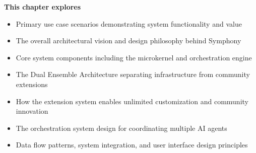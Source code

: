\begin{tcolorbox}[
    enhanced,
    colback=white,
    colframe=brandAccent!40,
    boxrule=1pt,
    arc=12pt,
    drop shadow={brandAccent!20},
    left=1.5cm,
    right=1.5cm,
    top=1.0cm,
    bottom=1.0cm,
    before upper={\parindent0pt}
]
\begin{center}
{\Large\textbf{\textcolor{brandAccent}{This chapter explores}}}
\end{center}

\vspace{0.8cm}

\begin{itemize}[leftmargin=1.2cm, itemsep=0.4cm, label={\textcolor{brandAccent}{$\triangleright$}}]
    \item {\large Primary use case scenarios demonstrating system functionality and value}
    \item {\large The overall architectural vision and design philosophy behind Symphony}
    \item {\large Core system components including the microkernel and orchestration engine}
    \item {\large The Dual Ensemble Architecture separating infrastructure from community extensions}
    \item {\large How the extension system enables unlimited customization and community innovation}
    \item {\large The orchestration system design for coordinating multiple AI agents}
    \item {\large Data flow patterns, system integration, and user interface design principles}
\end{itemize}
\end{tcolorbox}

\clearpage
